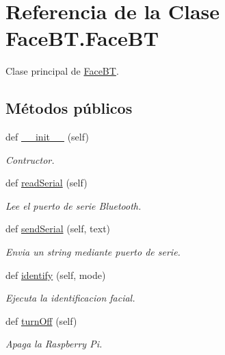 \hypertarget{class_face_b_t_1_1_face_b_t}{}\section{Referencia de la Clase Face\+B\+T.\+Face\+BT}
\label{class_face_b_t_1_1_face_b_t}


Clase principal de \mbox{\hyperlink{class_face_b_t_1_1_face_b_t}{Face\+BT}}.  


\subsection*{Métodos públicos}
\begin{DoxyCompactItemize}
\item 
def \mbox{\hyperlink{class_face_b_t_1_1_face_b_t_a577945ffe52fd053fabb2cf47b55dad2}{\+\_\+\+\_\+init\+\_\+\+\_\+}} (self)
\begin{DoxyCompactList}\small\item\em Contructor. \end{DoxyCompactList}\item 
def \mbox{\hyperlink{class_face_b_t_1_1_face_b_t_af35d86c0311c080589128342dcb414a0}{read\+Serial}} (self)
\begin{DoxyCompactList}\small\item\em Lee el puerto de serie Bluetooth. \end{DoxyCompactList}\item 
def \mbox{\hyperlink{class_face_b_t_1_1_face_b_t_a6f362adf4c828653782877a661b4714d}{send\+Serial}} (self, text)
\begin{DoxyCompactList}\small\item\em Envia un string mediante puerto de serie. \end{DoxyCompactList}\item 
def \mbox{\hyperlink{class_face_b_t_1_1_face_b_t_a52e80d7d39f01c59794927eba5ff833d}{identify}} (self, mode)
\begin{DoxyCompactList}\small\item\em Ejecuta la identificacion facial. \end{DoxyCompactList}\item 
def \mbox{\hyperlink{class_face_b_t_1_1_face_b_t_a4ca8c746966a8a3716113db50b0ce01d}{turn\+Off}} (self)
\begin{DoxyCompactList}\small\item\em Apaga la Raspberry Pi. \end{DoxyCompactList}\end{DoxyCompactItemize}
